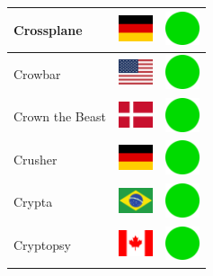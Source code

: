 \documentclass[12pt, a4paper, twoside]{report}
\begin{document}
\begin{center}
\begin{longtable}{|p{5cm}|p{2cm}|p{2cm}|}
 Crossplane                                                 & \includegraphics[width=1cm]{../4x3/de} &   \includegraphics[width=1cm]{../likes/y} \\ \hline
 Crowbar                                                    & \includegraphics[width=1cm]{../4x3/us} &   \includegraphics[width=1cm]{../likes/y} \\ \hline
 Crown the Beast                                            & \includegraphics[width=1cm]{../4x3/dk} &   \includegraphics[width=1cm]{../likes/y} \\ \hline
 Crusher                                                    & \includegraphics[width=1cm]{../4x3/de} &   \includegraphics[width=1cm]{../likes/y} \\ \hline
 Crypta                                                     & \includegraphics[width=1cm]{../4x3/br} &   \includegraphics[width=1cm]{../likes/y} \\ \hline
 Cryptopsy                                                  & \includegraphics[width=1cm]{../4x3/ca} &   \includegraphics[width=1cm]{../likes/y} \\ \hline

\end{longtable}
\end{center}
\end{document}
